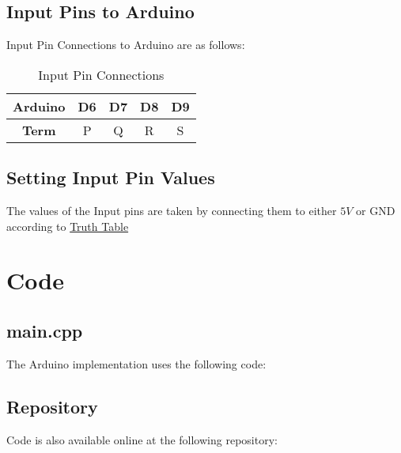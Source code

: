 \documentclass[a4paper,11pt]{article}
\newcommand\HSPC{\rule{0pt}{4ex}\rule[-2.0ex]{0pt}{0pt}}
\begin{document}
    \subsection{Input Pins to Arduino} {
        Input Pin Connections to Arduino are as follows:
        \begin{table}[ht]
            \centering
            \begin{tabular}{|c |c |c |c |c |}
            \hline
                \textbf{Arduino} & D6 & D7 & D8 & D9 \HSPC \\
            \hline
                \textbf{Term} & P & Q & R & S \HSPC \\
            \hline
            \end{tabular}
            \caption{Input Pin Connections}
            \label{tab:cnct_ip}
        \end{table}
    }
    
\subsection{Setting Input Pin Values}
        The values of the Input pins are taken by connecting them to either $5V$ or GND according to \hyperref[sec:ttf]{Truth Table}
\bigskip    

\newpage
\section{Code}
\subsection{main.cpp}
The Arduino implementation uses the following code:
\begin{center}
    
\end{center}

\subsection{Repository}
Code is also available online at the following repository:
\begin{center}
    \setlength{\fboxsep}{1em}
    
\end{center}
\end{document}
